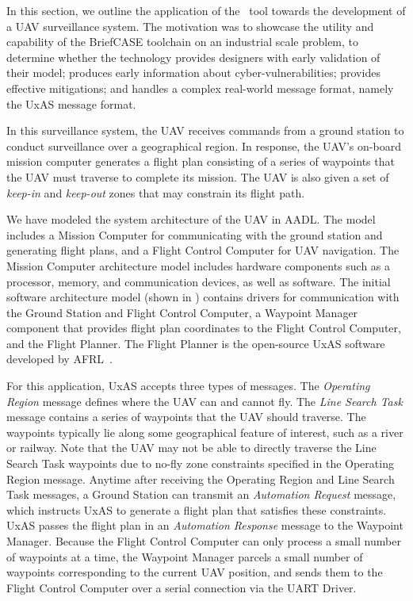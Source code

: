 In this section, we outline the application of the \brfcs\ tool towards the development of a UAV surveillance system.
The motivation was to showcase the utility and capability of the BriefCASE toolchain on an industrial scale problem, to determine whether the technology provides designers with early validation of their model; produces early information about cyber-vulnerabilities; provides effective mitigations; and handles a complex real-world message format, namely  the UxAS message format.

In this surveillance system, the UAV receives commands from a ground station to conduct surveillance over a geographical region. In response, the UAV's on-board mission computer generates a flight plan consisting of a series of waypoints that the UAV must traverse to complete its mission. The UAV is also given a set of \textit{keep-in} and \textit{keep-out} zones that may constrain its flight path.

We have modeled the system architecture of the UAV in AADL.  The model includes a Mission Computer for communicating with the ground station and generating flight plans, and a Flight Control Computer for UAV navigation.  The Mission Computer architecture model includes hardware components such as a processor, memory, and communication devices, as well as software.
%
The initial software architecture model (shown in ) contains drivers for communication with the Ground Station and Flight Control Computer, a Waypoint Manager component that provides flight plan coordinates to the Flight Control Computer, and the Flight Planner.  The Flight Planner is the open-source UxAS software developed by AFRL~\cite{uxas}.

For this application, UxAS accepts three types of messages.  The \textit{Operating Region} message defines where the UAV can and cannot fly.  The \textit{Line Search Task} message contains a series of waypoints that the UAV should traverse.  The waypoints typically lie along some geographical feature of interest, such as a river or railway.  Note that the UAV may not be able to directly traverse the Line Search Task waypoints due to no-fly zone constraints specified in the Operating Region message.  Anytime after receiving the Operating Region and Line Search Task messages, a Ground Station can transmit an \textit{Automation Request} message, which instructs UxAS to generate a flight plan that satisfies these constraints.  UxAS passes the flight plan in an \textit{Automation Response} message to the Waypoint Manager.  Because the Flight Control Computer can only process a small number of waypoints at a time, the Waypoint Manager parcels a small number of waypoints corresponding to the current UAV position, and sends them to the Flight Control Computer over a serial connection via the UART Driver.

